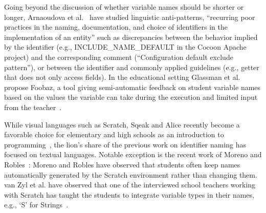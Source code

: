 \documentclass[conference]{IEEEtran}
\begin{document}
%

Going beyond the discussion of whether variable names should be shorter or longer, Arnaoudova et al.~\cite{ArnaoudovaPAG13,ArnaoudovaPA16} have studied linguistic anti-patterns, ``recurring poor practices in the naming, documentation, and choice of identifiers in the implementation of an entity'' such as discrepancies between the behavior implied by the identifier (e.g., {\sc INCLUDE\_NAME\_DEFAULT} in the Cocoon Apache project) and the corresponding comment (``Configuration default exclude pattern''), or between the identifier and commonly applied guidelines (e.g., getter that does not only access fields). 
In the educational setting Glassman et al. propose Foobaz, a tool giving semi-automatic feedback on student variable names based on the values the variable can take during the execution and limited input from the teacher~\cite{Glassman}.

While visual languages such as Scratch, Sqeak and Alice recently become a favorable choice for elementary and high schools as an introduction to programming~\cite{Matsuzawa}, the lion's share of the previous work on identifier naming has focused on textual languages.
Notable exception is the recent work of Moreno and Robles~\cite{MoreonoRobles}: Moreno and Robles have observed that students often keep names automatically generated by the Scratch environment rather than changing them. 
van Zyl et al. have observed that one of the interviewed school teachers working with Scratch has taught the students to integrate variable types in their names, e.g., `S' for Strings~\cite{vanZyl}.
\end{document}
